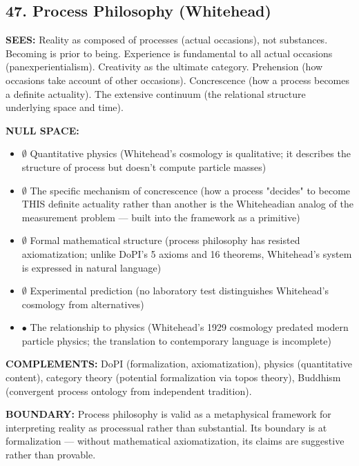 \bigskip\noindent\makebox[\textwidth]{\color{rulegray}\rule{5cm}{0.3pt}}\bigskip


\subsection*{47. Process Philosophy (Whitehead)}


\textbf{SEES:} Reality as composed of processes (actual occasions), not substances. Becoming is prior to being. Experience is fundamental to all actual occasions (panexperientialism). Creativity as the ultimate category. Prehension (how occasions take account of other occasions). Concrescence (how a process becomes a definite actuality). The extensive continuum (the relational structure underlying space and time).


\textbf{NULL SPACE:}

\begin{itemize}[nosep,leftmargin=*]
  \item $\emptyset$ Quantitative physics (Whitehead's cosmology is qualitative; it describes the structure of process but doesn't compute particle masses)
  \item $\emptyset$ The specific mechanism of concrescence (how a process "decides" to become THIS definite actuality rather than another is the Whiteheadian analog of the measurement problem — built into the framework as a primitive)
  \item $\emptyset$ Formal mathematical structure (process philosophy has resisted axiomatization; unlike DoPI's 5 axioms and 16 theorems, Whitehead's system is expressed in natural language)
  \item $\emptyset$ Experimental prediction (no laboratory test distinguishes Whitehead's cosmology from alternatives)
  \item $\bullet$ The relationship to physics (Whitehead's 1929 cosmology predated modern particle physics; the translation to contemporary language is incomplete)
\end{itemize}


\textbf{COMPLEMENTS:} DoPI (formalization, axiomatization), physics (quantitative content), category theory (potential formalization via topos theory), Buddhism (convergent process ontology from independent tradition).


\textbf{BOUNDARY:} Process philosophy is valid as a metaphysical framework for interpreting reality as processual rather than substantial. Its boundary is at formalization — without mathematical axiomatization, its claims are suggestive rather than provable.


